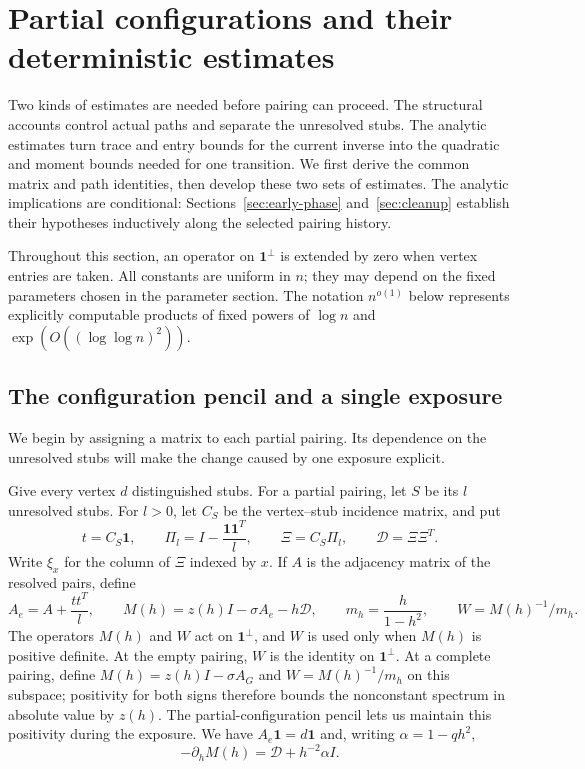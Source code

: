 \section{Partial configurations and their deterministic estimates}
\label{sec:foundations}

Two kinds of estimates are needed before pairing can proceed. The
structural accounts control actual paths and separate the unresolved
stubs. The analytic estimates turn trace and entry bounds for the
current inverse into the quadratic and moment bounds needed for one
transition. We first derive the common matrix and path identities, then
develop these two sets of estimates. The analytic implications are
conditional: Sections~\ref{sec:early-phase} and~\ref{sec:cleanup} establish
their hypotheses inductively along the selected pairing history.

Throughout this section, an operator on $\mathbf 1^\perp$ is extended by
zero when vertex entries are taken. All constants are uniform in $n$;
they may depend on the fixed parameters chosen in the parameter section.
The notation $n^{o(1)}$ below represents explicitly computable products of
fixed powers of $\log n$ and $\exp(O((\log\log n)^2))$.

\subsection{The configuration pencil and a single exposure}

We begin by assigning a matrix to each partial pairing. Its dependence
on the unresolved stubs will make the change caused by one exposure
explicit.

Give every vertex $d$ distinguished stubs. For a partial pairing, let $S$
be its $l$ unresolved stubs. For $l>0$, let $C_S$ be the vertex--stub
incidence matrix, and put
\[
 t=C_S\mathbf 1,\qquad
 \Pi_l=I-\frac{\mathbf 1\mathbf 1^T}{l},\qquad
 \Xi=C_S\Pi_l,\qquad \mathcal D=\Xi\Xi^T.
\]
Write $\xi_x$ for the column of $\Xi$ indexed by $x$. If $A$ is the
adjacency matrix of the resolved pairs, define
\[
 A_e=A+\frac{tt^T}{l},\qquad
 M(h)=z(h)I-\sigma A_e-h\mathcal D,\qquad
 m_h=\frac{h}{1-h^2},\qquad W=M(h)^{-1}/m_h.
\]
The operators $M(h)$ and $W$ act on $\mathbf 1^\perp$, and $W$ is used
only when $M(h)$ is positive definite. At the empty pairing, $W$ is the
identity on $\mathbf1^\perp$. At a complete pairing, define
$M(h)=z(h)I-\sigma A_G$ and $W=M(h)^{-1}/m_h$ on this subspace;
positivity for both signs
therefore bounds the nonconstant spectrum in absolute value by $z(h)$.
The partial-configuration pencil lets us maintain this positivity during
the exposure. We have $A_e\mathbf 1=d\mathbf 1$
and, writing $\alpha=1-qh^2$,
\[
 -\partial_hM(h)=\mathcal D+h^{-2}\alpha I.
\]

